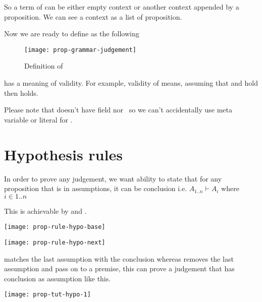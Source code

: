 \documentclass[master.tex]{subfiles}
\begin{document}
\newcommand{\propEmptyContext}{\bat{\pifmt{$\epsilon$}}}

So a term of  can be either empty context or another context
appended by a proposition. We can see a context as a list of proposition.

Now we are ready to define  as the following

\begin{figure}[H]
    \centering
\begin{minipage}{0.7\textwidth}
    \texttt{[image: prop-grammar-judgement]}
\end{minipage}
\caption{Definition of }
\label{fig:prop-grammar-judgement}
\end{figure}

\newcommand{\propTurnstile}{\pifmt{$\vdash$}}

 has a meaning of validity. For example, validity of
 means, assuming that  and
 hold then  holds.

Please note that  doesn't have field \kMetaVarRegex nor
\kLiteralRegex \ so we can't accidentally use meta variable or literal for
.

\section{Hypothesis rules}

In order to prove any judgement, we want ability to state that for any
proposition that is in assumptions, it can be conclusion i.e. $A_{1..n} \vdash
A_i$ where $i \in {1..n}$

This is achievable by  and .

\begin{center}
\texttt{[image: prop-rule-hypo-base]}
\end{center}
\begin{center}
\texttt{[image: prop-rule-hypo-next]}
\end{center}

 matches the last assumption with the conclusion whereas
 removes the last assumption and pass on to a premise,
this can prove a judgement that has conclusion as assumption like this.

\begin{center}
\texttt{[image: prop-tut-hypo-1]}
\end{center}
\end{document}
